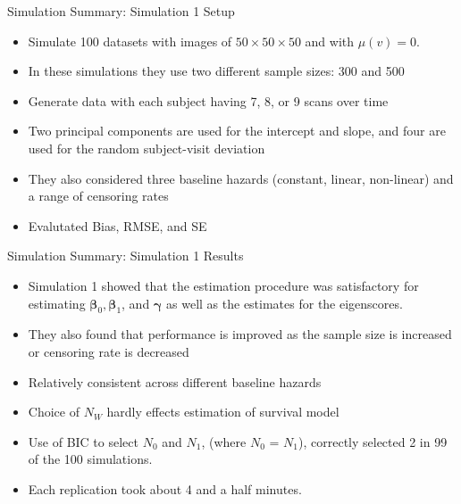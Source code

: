 \documentclass[
  ignorenonframetext,
]{beamer}
\providecommand{\tightlist}{%
  \setlength{\itemsep}{0pt}\setlength{\parskip}{0pt}}
\begin{document}
\begin{frame}{Simulation Summary: Simulation 1 Setup}
\protect\hypertarget{simulation-summary-simulation-1-setup}{}
\begin{itemize}
\tightlist
\item
  Simulate 100 datasets with images of \(50 \times 50 \times 50\) and
  with \(\mu(v) = 0\).
\item
  In these simulations they use two different sample sizes: 300 and 500
\item
  Generate data with each subject having 7, 8, or 9 scans over time
\item
  Two principal components are used for the intercept and slope, and
  four are used for the random subject-visit deviation
\item
  They also considered three baseline hazards (constant, linear,
  non-linear) and a range of censoring rates
\item
  Evalutated Bias, RMSE, and SE
\end{itemize}
\end{frame}

\begin{frame}{Simulation Summary: Simulation 1 Results}
\protect\hypertarget{simulation-summary-simulation-1-results}{}
\begin{itemize}
\tightlist
\item
  Simulation 1 showed that the estimation procedure was satisfactory for
  estimating \(\boldsymbol{\beta}_0, \boldsymbol{\beta}_1\), and
  \(\boldsymbol{\gamma}\) as well as the estimates for the eigenscores.
\item
  They also found that performance is improved as the sample size is
  increased or censoring rate is decreased
\item
  Relatively consistent across different baseline hazards
\item
  Choice of \(N_W\) hardly effects estimation of survival model
\item
  Use of BIC to select \(N_0\) and \(N_1\), (where \(N_0\) = \(N_1\)),
  correctly selected 2 in 99 of the 100 simulations.
\item
  Each replication took about 4 and a half minutes.
\end{itemize}
\end{frame}
\end{document}
